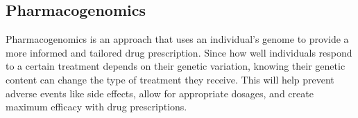\documentclass[11pt]{article}
\begin{document}
\subsection{Pharmacogenomics}
\label{sec:org0053d91}
Pharmacogenomics is an approach that uses an individual's genome to provide a more informed and tailored drug prescription. Since how well individuals respond to a certain treatment depends on their genetic variation, knowing their genetic content can change the type of treatment they receive. This will help prevent adverse events like side effects, allow for appropriate dosages, and create maximum efficacy with drug prescriptions.
\end{document}
